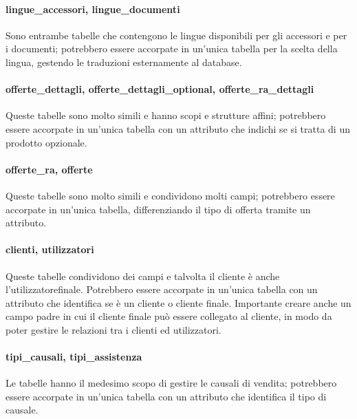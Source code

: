 \documentclass[12pt, a4paper]{article}
\begin{document}
\paragraph{lingue\_accessori, lingue\_documenti}
Sono entrambe tabelle che contengono le lingue disponibili per gli accessori e per i documenti; potrebbero essere accorpate in un'unica tabella per la scelta della lingua, gestendo le traduzioni esternamente al database.

\paragraph{offerte\_dettagli, offerte\_dettagli\_optional, offerte\_ra\_dettagli}
Queste tabelle sono molto simili e hanno scopi e strutture affini; potrebbero essere accorpate in un'unica tabella con un attributo che indichi se si tratta di un prodotto opzionale.

\paragraph{offerte\_ra, offerte}
Queste tabelle sono molto simili e condividono molti campi; potrebbero essere accorpate in un'unica tabella, differenziando il tipo di offerta tramite un attributo.

\paragraph{clienti, utilizzatori}
Queste tabelle condividono dei campi e talvolta il cliente è anche l'utilizzatorefinale.
Potrebbero essere accorpate in un'unica tabella con un attributo che identifica se è un cliente o cliente finale.
Importante creare anche un campo padre in cui il cliente finale può essere collegato al cliente, in modo da poter
gestire le relazioni tra i clienti ed utilizzatori.
\paragraph{tipi\_causali, tipi\_assistenza}
Le tabelle hanno il medesimo scopo di gestire le causali di vendita;
potrebbero essere accorpate in un'unica tabella con un attributo che identifica il tipo di causale.
\end{document}
